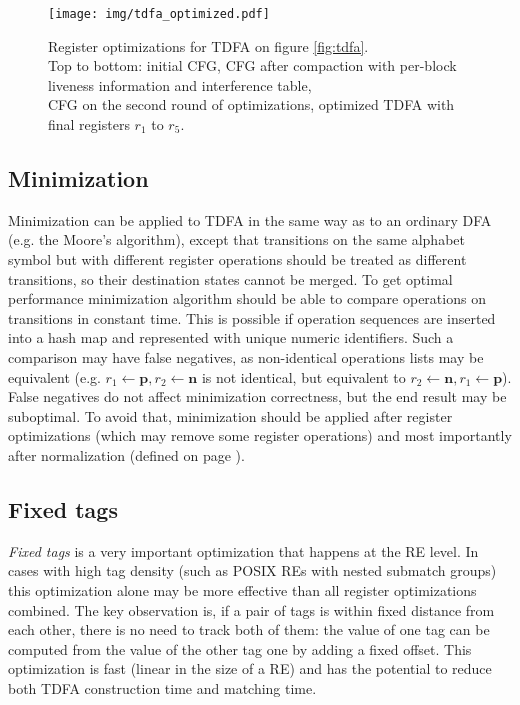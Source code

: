 \documentclass[]{article}
\begin{document}
\begin{figure}[]
\texttt{[image: img/tdfa\_optimized.pdf]}
\vspace{0.5em}
\caption{
Register optimizations for TDFA on figure \ref{fig:tdfa}. \\
Top to bottom: initial CFG,
CFG after compaction with per-block liveness information and interference table,\\
CFG on the second round of optimizations,
optimized TDFA with final registers $r_1$ to $r_5$.
}\label{fig:tdfa_regopt}
\end{figure}

\subsection{Minimization}

Minimization can be applied to TDFA in the same way as to an ordinary DFA (e.g. the Moore's algorithm),
except that transitions on the same alphabet symbol but with different register operations
should be treated as different transitions, so their destination states cannot be merged.
To get optimal performance minimization algorithm should be able to compare operations on transitions in constant time.
This is possible if operation sequences are inserted into a hash map and represented with unique numeric identifiers.
Such a comparison may have false negatives, as non-identical operations lists may be equivalent
(e.g. $r_1 \leftarrow \mathbf{p}, r_2 \leftarrow \mathbf{n}$ is not identical, but equivalent to $r_2 \leftarrow \mathbf{n}, r_1 \leftarrow \mathbf{p}$).
False negatives do not affect minimization correctness, but the end result may be suboptimal.
To avoid that, minimization should be applied after register optimizations (which may remove some register operations)
and most importantly after normalization (defined on page \pageref{alg_opt2}).

\subsection{Fixed tags}

\newcommand\nan{N\!a\!N}
\newcommand\nobasetag{-1}%

\emph{Fixed tags} is a very important optimization that happens at the RE level.
In cases with high tag density (such as POSIX REs with nested submatch groups)
this optimization alone may be more effective than all register optimizations combined.
%
The key observation is,
if a pair of tags is within fixed distance from each other, there is no need to track both of them:
the value of one tag can be computed from the value of the other tag one by adding a fixed offset.
%
This optimization is fast (linear in the size of a RE)
and has the potential to reduce both TDFA construction time and matching time.
\medskip
\end{document}
